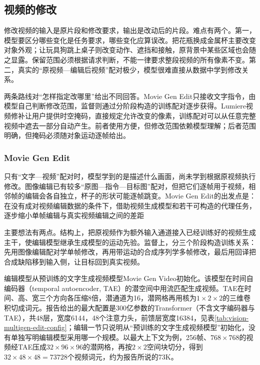 \subsection{视频的修改}
\label{sec:vision-multigen-edit-video}

修改视频的输入是原片段和修改要求，输出是改动后的片段。难点有两个。第一，模型要区分哪些变化是任务要求，哪些变化应算误改。把花瓶换成金属杯主要改变对象外观；让玩具狗跳上桌子则改变动作、遮挡和接触，原背景中某些区域也会随之显露。保留范围必须根据请求判断，不能一律要求整段视频的所有像素不变。第二，真实的“原视频—编辑后视频”配对极少，模型很难直接从数据中学到修改关系。

两条路线对“怎样指定改哪里”给出不同回答。Movie Gen Edit只接收文字指令，由模型自己判断修改范围，监督则通过分阶段构造的训练配对逐步获得。Lumiere视频修补让用户提供时空掩码，直接规定允许改变的像素，训练配对可以从任意完整视频中遮去一部分自动产生。前者使用方便，但修改范围依赖模型理解；后者范围明确，但掩码必须随对象运动逐帧给出。

\Needspace{60mm}
\subsubsection{Movie Gen Edit}
\label{sec:vision-multigen-movie-edit}

只有“文字—视频”配对时，模型学到的是描述什么画面，尚未学到根据原视频执行修改。图像编辑已有较多“原图—指令—目标图”配对，但把它们逐帧用于视频，相邻帧的编辑会各自独立，杯子的形状可能逐帧跳变。Movie Gen Edit的出发点是：在没有成对视频编辑数据的条件下，借助视频生成模型和若干可构造的代理任务，逐步缩小单帧编辑与真实视频编辑之间的差距

主要想法有两点。结构上，把原视频作为额外输入通道接入已经训练好的视频生成主干，使编辑模型继承生成模型的运动先验。监督上，分三个阶段构造训练关系：先用图像编辑配对学单帧修改，再用带运动的合成序列学多帧修改，最后用回译把合成缺陷移到输入侧，让目标回到真实视频。

编辑模型从预训练的文字生成视频模型Movie Gen Video初始化。该模型在时间自编码器（temporal autoencoder, TAE）的潜空间中用流匹配生成视频。TAE在时间、高、宽三个方向各压缩8倍，潜通道为16，潜网格再用核为$1\times2\times2$的三维卷积切成词元。报告给出的最大配置是300亿参数的Transformer（不含文字编码器与TAE），共48层，宽度6144，48个注意力头，前馈层宽度16384，见表\ref{tab:vision-multigen-edit-config}；编辑一节只说明从“预训练的文字生成视频模型”初始化，没有单独写明编辑模型采用哪一个规模。以最大上下文为例，256帧、$768\times768$的视频经TAE压成$32\times96\times96$的潜网格，再按$2\times2$空间块切分，得到$32\times48\times48=73728$个视频词元，约为报告所说的73K。

